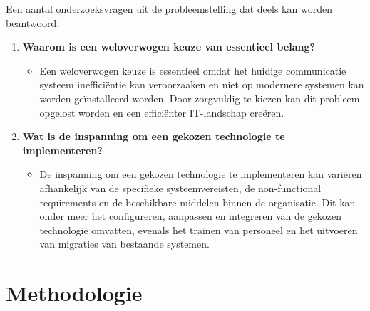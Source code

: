 Een aantal onderzoeksvragen uit de probleemstelling dat deels kan worden beantwoord:

\begin{enumerate}

\item \textbf{Waarom is een weloverwogen keuze van essentieel belang?}
  \begin{itemize}
      \item Een weloverwogen keuze is essentieel omdat het huidige communicatie systeem inefficiëntie kan veroorzaaken en niet op modernere systemen 
      kan worden geïnstalleerd worden. Door zorgvuldig te kiezen kan dit probleem opgelost worden en een 
      efficiënter IT-landschap creëren.
  \end{itemize}

\item \textbf{Wat is de inspanning om een gekozen technologie te implementeren?}
  \begin{itemize}
      \item De inspanning om een gekozen technologie te implementeren kan variëren afhankelijk van de specifieke systeemvereisten, 
      de non-functional requirements en de beschikbare middelen binnen de organisatie. Dit kan onder meer het configureren, 
      aanpassen en integreren van de gekozen technologie omvatten, evenals het trainen van personeel en het uitvoeren van migraties van 
      bestaande systemen.
  \end{itemize}
\end{enumerate}

\newpage

\section{Methodologie}%
\label{sec:methodologie}



